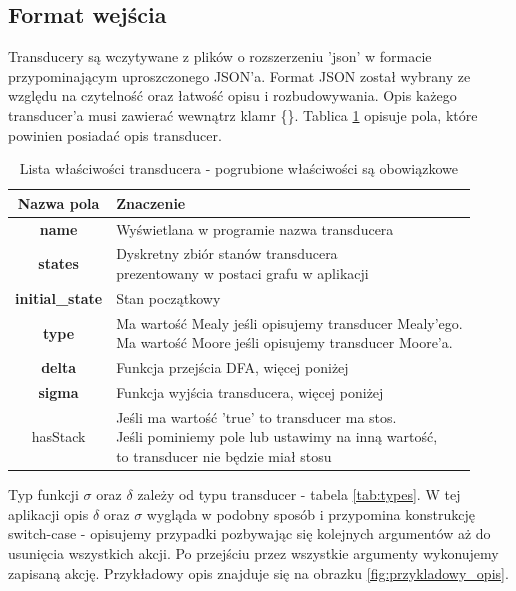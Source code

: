 \documentclass[declaration,shortabstract]{iithesis}
\theoremstyle{definition}
\theoremstyle{plain}
\begin{document}
\subsection{Format wejścia}
Transducery są wczytywane z plików o rozszerzeniu 'json' w formacie przypominającym uproszczonego JSON'a. Format JSON został wybrany ze względu na czytelność oraz łatwość opisu i rozbudowywania. Opis każego transducer'a musi zawierać wewnątrz klamr \{\}. Tablica \ref{tab:properties} opisuje pola, które powinien posiadać opis transducer.\\
\begin{table}[h]
    \centering
    \begin{tabular}{|c|l|}
    \hline
        Nazwa pola & Znaczenie \\ \hline\hline
        \textbf{name} & Wyświetlana w programie nazwa transducera \\\hline
        \textbf{states} & \makecell[l]{Dyskretny zbiór stanów transducera \\ prezentowany w postaci grafu w aplikacji} \\\hline
        \textbf{initial\_state} & Stan początkowy\\\hline
        \textbf{type} & \makecell[l]{Ma wartość Mealy jeśli opisujemy transducer Mealy'ego.\\
                                     Ma wartość Moore jeśli opisujemy transducer Moore'a.} \\\hline
        \textbf{delta} & Funkcja przejścia DFA, więcej poniżej \\\hline
        \textbf{sigma} & Funkcja wyjścia transducera, więcej poniżej \\\hline
        hasStack & \makecell[l]{Jeśli ma wartość 'true' to transducer ma stos.\\
                            Jeśli pominiemy pole lub ustawimy na inną wartość,\\
                            to transducer nie będzie miał stosu}\\\hline
    \end{tabular}
    \caption{Lista właściwości transducera - pogrubione właściwości są obowiązkowe}
    \label{tab:properties}
\end{table}
\pagebreak
Typ funkcji \(\sigma\) oraz \(\delta\) zależy od typu transducer - tabela \ref{tab:types}. W tej aplikacji opis \(\delta\) oraz \(\sigma\) wygląda w podobny sposób i przypomina konstrukcję switch-case - opisujemy przypadki pozbywając się kolejnych argumentów aż do usunięcia wszystkich akcji. Po przejściu przez wszystkie argumenty wykonujemy zapisaną akcję. Przykładowy opis znajduje się na obrazku \ref{fig:przykladowy_opis}. \\ 
\end{document}
